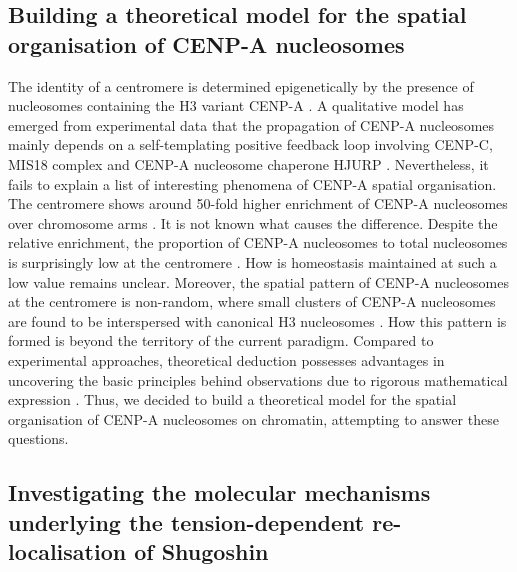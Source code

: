\subsection{Building a theoretical model for the spatial organisation of CENP-A nucleosomes}

The identity of a centromere is determined epigenetically by the presence of nucleosomes containing the H3 variant CENP-A \citep{Warburton1997ImmunolocalizationCentromeres, Vafa1997ChromatinPlate, Earnshaw1985ThreeChromosome, Liu2006MappingCells, Regnier2005CENP-ABubR1, Heun2006, Mendiburo2011, Barnhart2011, Logsdon2015, Logsdon2019}. A qualitative model has emerged from experimental data that the propagation of CENP-A nucleosomes mainly depends on a self-templating positive feedback loop involving CENP-C, MIS18 complex and CENP-A nucleosome chaperone HJURP \citep{McKinley2015, Stirpe2022}. Nevertheless, it fails to explain a list of interesting phenomena of CENP-A spatial organisation. The centromere shows around 50-fold higher enrichment of CENP-A nucleosomes over chromosome arms \citep{Bodor2014}. It is not known what causes the difference. Despite the relative enrichment, the proportion of CENP-A nucleosomes to total nucleosomes is surprisingly low at the centromere \citep{Bodor2014, Schittenhelm2010}. How is homeostasis maintained at such a low value remains unclear. Moreover, the spatial pattern of CENP-A nucleosomes at the centromere is non-random, where small clusters of CENP-A nucleosomes are found to be interspersed with canonical H3 nucleosomes \citep{Blower2002ConservedHumans, Dunleavy2011H3.3Phase., Kyriacou2018}. How this pattern is formed is beyond the territory of the current paradigm. Compared to experimental approaches, theoretical deduction possesses advantages in uncovering the basic principles behind observations due to rigorous mathematical expression \citep{Fidelman1985TheModeling}. Thus, we decided to build a theoretical model for the spatial organisation of CENP-A nucleosomes on chromatin, attempting to answer these questions. 

\subsection{Investigating the molecular mechanisms underlying the tension-dependent re-localisation of Shugoshin}

